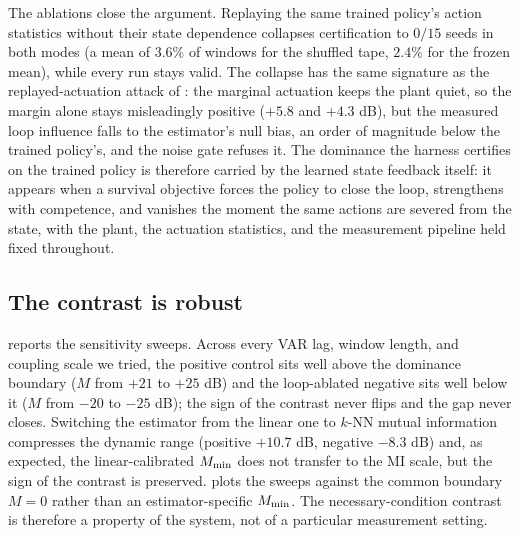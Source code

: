 \documentclass[11pt]{article}
\begin{document}
The ablations close the argument. Replaying the same trained policy's action statistics without their state dependence collapses certification to $0/15$ seeds in both modes (a mean of $3.6\%$ of windows for the shuffled tape, $2.4\%$ for the frozen mean), while every run stays valid. The collapse has the same signature as the replayed-actuation attack of : the marginal actuation keeps the plant quiet, so the margin alone stays misleadingly positive ($+5.8$ and $+4.3$ dB), but the measured loop influence falls to the estimator's null bias, an order of magnitude below the trained policy's, and the noise gate refuses it. The dominance the harness certifies on the trained policy is therefore carried by the learned state feedback itself: it appears when a survival objective forces the policy to close the loop, strengthens with competence, and vanishes the moment the same actions are severed from the state, with the plant, the actuation statistics, and the measurement pipeline held fixed throughout.


\subsection{The contrast is robust}
\label{sec:results_sensitivity}

 reports the sensitivity sweeps. Across every VAR lag, window length, and coupling scale we tried, the positive control sits well above the dominance boundary ($M$ from $+21$ to $+25$ dB) and the loop-ablated negative sits well below it ($M$ from $-20$ to $-25$ dB); the sign of the contrast never flips and the gap never closes. Switching the estimator from the linear one to $k$-NN mutual information compresses the dynamic range (positive $+10.7$ dB, negative $-8.3$ dB) and, as expected, the linear-calibrated $M_{\min}$ does not transfer to the MI scale, but the sign of the contrast is preserved.  plots the sweeps against the common boundary $M = 0$ rather than an estimator-specific $M_{\min}$. The necessary-condition contrast is therefore a property of the system, not of a particular measurement setting.
\end{document}
